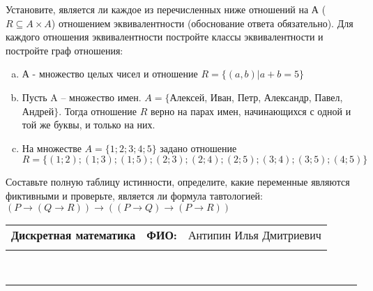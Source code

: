 \documentclass[10pt]{exam}
\newcommand{\class}{Дискретная математика}
\newcommand{\examdate}{}
\begin{document}
\begin{questions}
\question
Установите, является ли каждое из перечисленных ниже отношений на А ($R \subseteq A \times A$) отношением эквивалентности (обоснование ответа обязательно). Для каждого отношения эквивалентности постройте классы 
эквивалентности и постройте граф отношения:
\begin{enumerate} [a)]\setcounter{enumi}{0}
\item А - множество целых чисел и отношение $R = \{(a,b)|a + b = 5\}$
\item Пусть A – множество имен. $A = \{ $Алексей, Иван, Петр, Александр, Павел, Андрей$ \}$. Тогда отношение $R $ верно на парах имен, начинающихся с одной и той же буквы, и только на них.
\item На множестве $A = \{1; 2; 3; 4; 5\}$ задано отношение $R = \{(1; 2); (1; 3); (1; 5); (2; 3); (2; 4); (2; 5); (3; 4); (3; 5); (4; 5)\}$
\end{enumerate}\question Составьте полную таблицу истинности, определите, какие переменные являются фиктивными и проверьте, является ли формула тавтологией:
$(P \rightarrow (Q \rightarrow R)) \rightarrow ((P \rightarrow Q) \rightarrow (P \rightarrow R))$

\end{questions}
\newpage
\begin{flushright}
\begin{tabular}{p{2.8in} r l}
\textbf{\class} & \textbf{ФИО:} &Антипин Илья Дмитриевич
\\

\textbf{\examdate} &&\\
\end{tabular}\\
\end{flushright}
\rule[1ex]{\textwidth}{.1pt}
\end{document}

